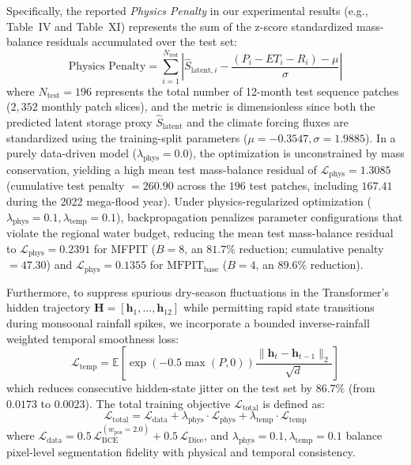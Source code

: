 \documentclass[journal]{IEEEtran}
\begin{document}
Specifically, the reported \textit{Physics Penalty} in our experimental results (e.g., Table~IV and Table~XI) represents the sum of the z-score standardized mass-balance residuals accumulated over the test set:
\begin{equation}
\text{Physics Penalty} = \sum_{i=1}^{N_{\text{test}}} \left|\hat{S}_{\text{latent}, i} - \frac{(P_i - ET_i - R_i) - \mu}{\sigma}\right|
\end{equation}
where $N_{\text{test}} = 196$ represents the total number of 12-month test sequence patches ($2,352$ monthly patch slices), and the metric is dimensionless since both the predicted latent storage proxy $\hat{S}_{\text{latent}}$ and the climate forcing fluxes are standardized using the training-split parameters ($\mu = -0.3547, \sigma = 1.9885$). In a purely data-driven model ($\lambda_{\text{phys}} = 0.0$), the optimization is unconstrained by mass conservation, yielding a high mean test mass-balance residual of $\mathcal{L}_{\text{phys}} = 1.3085$ (cumulative test penalty $= 260.90$ across the $196$ test patches, including $167.41$ during the 2022 mega-flood year). Under physics-regularized optimization ($\lambda_{\text{phys}} = 0.1, \lambda_{\text{temp}} = 0.1$), backpropagation penalizes parameter configurations that violate the regional water budget, reducing the mean test mass-balance residual to $\mathcal{L}_{\text{phys}} = 0.2391$ for MFPIT ($B=8$, an $81.7\%$ reduction; cumulative penalty $= 47.30$) and $\mathcal{L}_{\text{phys}} = 0.1355$ for $\text{MFPIT}_{\text{base}}$ ($B=4$, an $89.6\%$ reduction).

Furthermore, to suppress spurious dry-season fluctuations in the Transformer's hidden trajectory $\mathbf{H} = [\mathbf{h}_1, \dots, \mathbf{h}_{12}]$ while permitting rapid state transitions during monsoonal rainfall spikes, we incorporate a bounded inverse-rainfall weighted temporal smoothness loss:
\begin{equation}
\mathcal{L}_{\text{temp}} = \mathbb{E}\left[ \exp\!\left(-0.5 \max(P, 0)\right) \frac{\|\mathbf{h}_t - \mathbf{h}_{t-1}\|_2}{\sqrt{d}} \right]
\end{equation}
which reduces consecutive hidden-state jitter on the test set by $86.7\%$ (from $0.0173$ to $0.0023$). The total training objective $\mathcal{L}_{\text{total}}$ is defined as:
\begin{equation}
\mathcal{L}_{\text{total}} = \mathcal{L}_{\text{data}} + \lambda_{\text{phys}} \cdot \mathcal{L}_{\text{phys}} + \lambda_{\text{temp}} \cdot \mathcal{L}_{\text{temp}}
\end{equation}
where $\mathcal{L}_{\text{data}} = 0.5\,\mathcal{L}_{\text{BCE}}^{(w_{\text{pos}}=2.0)} + 0.5\,\mathcal{L}_{\text{Dice}}$, and $\lambda_{\text{phys}} = 0.1, \lambda_{\text{temp}} = 0.1$ balance pixel-level segmentation fidelity with physical and temporal consistency.
\end{document}
